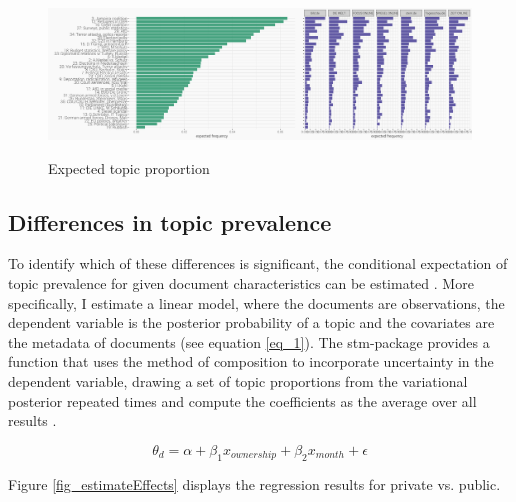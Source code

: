 \documentclass[12pt,a4paper,notitlepage]{article}
\begin{document}
\begin{figure}[H]
	\begin{center}
	\caption{Expected topic proportion}
		\includegraphics[width=\textwidth,keepaspectratio]{../figs/topic_proportion.png}
		\label{fig_topic_proportion}
\end{center}
\end{figure}

\subsection{Differences in topic prevalence}\label{subsectiona_topicprevalence}

To identify which of these differences is significant, the conditional expectation of topic prevalence for given document characteristics can be estimated \citep{roberts_model_2016}. More specifically, I estimate a linear model, where the documents are observations, the dependent variable is the posterior probability of a topic and the covariates are the metadata of documents (see equation \ref{eq_1}). The stm-package provides a function that uses the method of composition to incorporate uncertainty in the dependent variable, drawing a set of topic proportions from the variational posterior repeated times and compute the coefficients as the average over all results \citep{roberts_stm:_2016}.

\begin{equation}\label{eq_1}
	\theta_d=\alpha+\beta_1x_{ownership}+\beta_2x_{month}+\epsilon
\end{equation}

Figure \ref{fig_estimateEffects} displays the regression results for private vs. public. 
\end{document}
